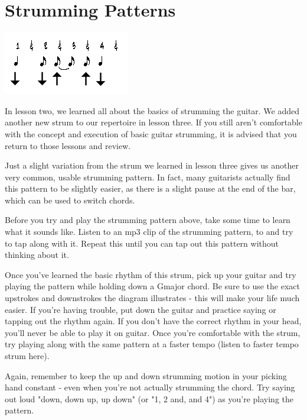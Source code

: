 \section{Strumming Patterns}
\includegraphics{partfour/strum4.png}

In lesson two, we learned all about the basics of strumming the guitar. We
added another new strum to our repertoire in lesson three. If you still aren't
comfortable with the concept and execution of basic guitar strumming, it is
advised that you return to those lessons and review.

Just a slight variation from the strum we learned in lesson three gives us
another very common, usable strumming pattern. In fact, many guitarists
actually find this pattern to be slightly easier, as there is a slight pause at
the end of the bar, which can be used to switch chords.

Before you try and play the strumming pattern above, take some time to learn
what it sounds like. Listen to an mp3 clip of the strumming pattern, to and try
to tap along with it. Repeat this until you can tap out this pattern without
thinking about it.

Once you've learned the basic rhythm of this strum, pick up your guitar and try
playing the pattern while holding down a Gmajor chord. Be sure to use the exact
upstrokes and downstrokes the diagram illustrates - this will make your life
much easier. If you're having trouble, put down the guitar and practice saying
or tapping out the rhythm again. If you don't have the correct rhythm in your
head, you'll never be able to play it on guitar. Once you're comfortable with
the strum, try playing along with the same pattern at a faster tempo (listen to
faster tempo strum here).

Again, remember to keep the up and down strumming motion in your picking hand
constant - even when you're not actually strumming the chord. Try saying out
loud "down, down up, up down" (or "1, 2 and, and 4") as you're playing the
pattern.


